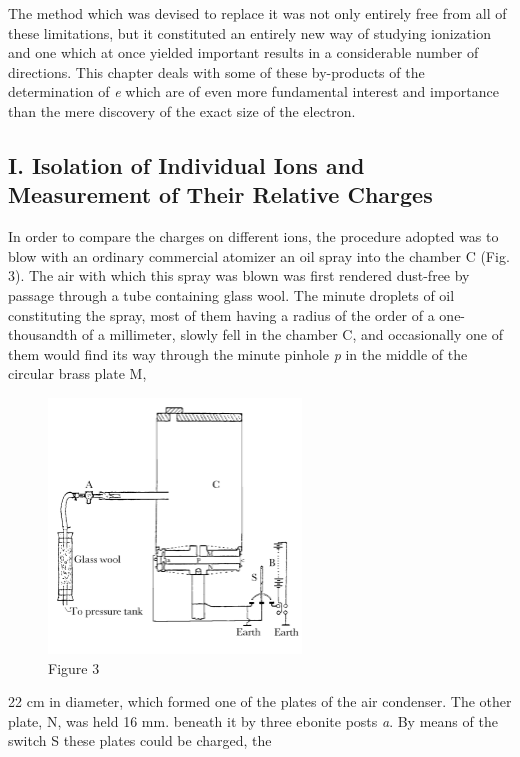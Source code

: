 The method which was devised to replace it was not only entirely free
from all of these limitations, but it constituted an entirely new way of
studying ionization and one which at once yielded important results in a
considerable number of directions. This chapter deals with some of these
by-products of the determination of \emph{e} which are of even more
fundamental interest and importance than the mere discovery of the exact
size of the electron.

\subsection*{I. Isolation of Individual Ions and Measurement of Their Relative Charges}

In order to compare the charges on different ions, the procedure adopted
was to blow with an ordinary commercial atomizer an oil spray into the
chamber C (Fig. 3). The air with which this spray was blown was first
rendered dust-free by passage through a tube containing glass wool. The
minute droplets of oil constituting the spray, most of them having a
radius of the order of a one-thousandth of a millimeter, slowly fell in
the chamber C, and occasionally one of them would find its way through
the minute pinhole \emph{p} in the middle of the circular brass plate M,
\begin{figure}[h]
  \begin{center}
    \includegraphics[width=0.6\textwidth]{images/03_millikan/image013.png}
  \end{center}
  \caption*{Figure 3}
\end{figure}
22 cm in diameter, which formed one of the plates of the air condenser.
The other plate, N, was held 16 mm. beneath it by three ebonite posts
\emph{a}. By means of the switch S these plates could be charged, the
